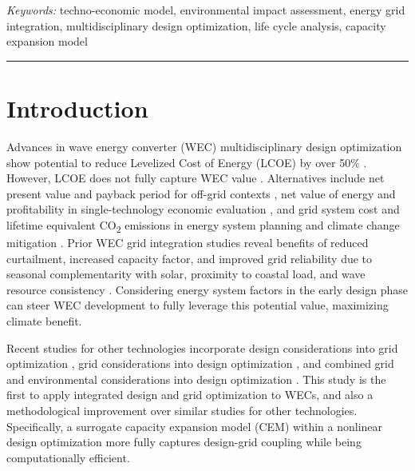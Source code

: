 \documentclass[10pt,twoside]{article}
\begin{document}
\vspace{.5\baselineskip}
\textit{Keywords:} techno-economic model, environmental impact assessment, energy grid integration, multidisciplinary design optimization, life cycle analysis, capacity expansion model

\noindent\rule{\textwidth}{0.4pt}

\section{Introduction}
Advances in wave energy converter (WEC) multidisciplinary design optimization show potential to reduce Levelized Cost of Energy (LCOE) by over 50\% \cite{mccabe_leveraging_2025}.
However, LCOE does not fully capture WEC value \cite{mowers_evaluation_2021,moraski_beyond_2025}.
Alternatives include net present value and payback period for off-grid contexts \cite{jenne_powering_2021}, net value of energy and profitability in single-technology economic evaluation \cite{mowers_evaluation_2021,makaremi_economic_2025}, and grid system cost and lifetime equivalent CO\textsubscript{2} emissions in energy system planning and climate change mitigation \cite{moraski_beyond_2025}.
Prior WEC grid integration studies reveal benefits of reduced curtailment, increased capacity factor, and improved grid reliability due to seasonal complementarity with solar, proximity to coastal load, and wave resource consistency \cite{akdemir_opportunities_2023,bhattacharya_timing_2021,pennock_temporal_2022}.
Considering energy system factors in the early design phase can steer WEC development to fully leverage this potential value, maximizing climate benefit.

Recent studies for other technologies incorporate design considerations into grid optimization \cite{schwartz_value_2023,ricks_value_2022}, grid considerations into design optimization \cite{mehta_designing_2024}, and combined grid and environmental considerations into design optimization \cite{canet_eco-conscious_2023,kainz_how_2024}.
This study is the first to apply integrated design and grid optimization to WECs, and also a methodological improvement over similar studies for other technologies. 
Specifically, a surrogate capacity expansion model (CEM) within a nonlinear design optimization more fully captures design-grid coupling while being computationally efficient.
\end{document}
